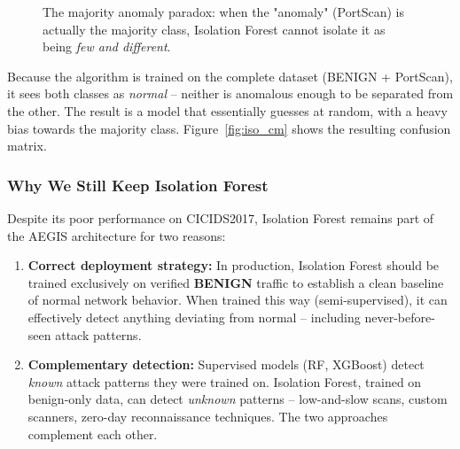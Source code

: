 \begin{figure}[H]
\centering
{}
\caption{The majority anomaly paradox: when the "anomaly" (PortScan) is actually the majority class, Isolation Forest cannot isolate it as being \textit{few and different}.}
\label{fig:majority_paradox}
\end{figure}

Because the algorithm is trained on the complete dataset (BENIGN + PortScan), it sees both classes as \textit{normal} -- neither is anomalous enough to be separated from the other. The result is a model that essentially guesses at random, with a heavy bias towards the majority class. Figure~\ref{fig:iso_cm} shows the resulting confusion matrix.

\subsubsection{Why We Still Keep Isolation Forest}

Despite its poor performance on CICIDS2017, Isolation Forest remains part of the AEGIS architecture for two reasons:

\begin{enumerate}
    \item \textbf{Correct deployment strategy:} In production, Isolation Forest should be trained exclusively on verified \textbf{BENIGN} traffic to establish a clean baseline of normal network behavior. When trained this way (semi-supervised), it can effectively detect anything deviating from normal -- including never-before-seen attack patterns.

    \item \textbf{Complementary detection:} Supervised models (RF, XGBoost) detect \textit{known} attack patterns they were trained on. Isolation Forest, trained on benign-only data, can detect \textit{unknown} patterns -- low-and-slow scans, custom scanners, zero-day reconnaissance techniques. The two approaches complement each other.
\end{enumerate}

